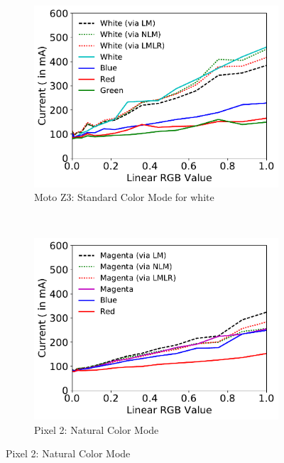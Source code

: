 \begin{figure}[tp]
\begin{subfigure}[]{0.31\textwidth}
		\label{fig:initial_evaluation_2_p2_w_c}
	\end{subfigure}
	\hfill
	\begin{subfigure}[]{0.31\textwidth}
		\includegraphics[width=\textwidth]{./figure/1603_Z3_Standard_White.pdf}
		\caption{Moto Z3: Standard Color Mode for white}
		\label{fig:initial_evaluation_2_z3_w_c}
	\end{subfigure}
\\
	\begin{subfigure}[]{0.31\textwidth}
		\includegraphics[width=\textwidth]{./figure/1632_P2_Natural_Magenta.pdf}
		\caption{Pixel 2: Natural Color Mode}
		\label{fig:initial_evaluation_2_n6_m_c for magenta}
	\end{subfigure}

\end{figure}
